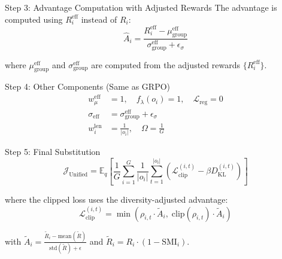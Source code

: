 \documentclass[11pt,a4paper]{article}
\begin{document}
\begin{proofbox}{Step 3: Advantage Computation with Adjusted Rewards}
The advantage is computed using $R_i^{\text{eff}}$ instead of $R_i$:
\begin{equation}
\hat{A}_i = \frac{R_i^{\text{eff}} - \mu_{\text{group}}^{\text{eff}}}{\sigma_{\text{group}}^{\text{eff}} + \epsilon_\sigma}
\end{equation}

where $\mu_{\text{group}}^{\text{eff}}$ and $\sigma_{\text{group}}^{\text{eff}}$ are computed from the adjusted rewards $\{R_i^{\text{eff}}\}$.
\end{proofbox}

\begin{proofbox}{Step 4: Other Components (Same as GRPO)}
\begin{align}
w_\mu^{\text{eff}} &= 1, \quad f_\lambda(o_i) = 1, \quad \mathcal{L}_{\text{reg}} = 0 \\
\sigma_{\text{eff}} &= \sigma_{\text{group}}^{\text{eff}} + \epsilon_\sigma \\
w_i^{\text{len}} &= \frac{1}{|o_i|}, \quad \Omega = \frac{1}{G}
\end{align}
\end{proofbox}

\begin{proofbox}{Step 5: Final Substitution}
\begin{equation}
\mathcal{J}_{\text{Unified}} = \mathbb{E}_{q} \left[ \frac{1}{G} \sum_{i=1}^{G} \frac{1}{|o_i|} \sum_{t=1}^{|o_i|} \left( \mathcal{L}_{\text{clip}}^{(i,t)} - \beta D_{\text{KL}}^{(i,t)} \right) \right]
\end{equation}

where the clipped loss uses the diversity-adjusted advantage:
\begin{equation}
\mathcal{L}_{\text{clip}}^{(i,t)} = \min\left( \rho_{i,t} \cdot \tilde{A}_i, \; \text{clip}(\rho_{i,t}) \cdot \tilde{A}_i \right)
\end{equation}

with $\tilde{A}_i = \frac{\tilde{R}_i - \text{mean}(\tilde{R})}{\text{std}(\tilde{R}) + \epsilon}$ and $\tilde{R}_i = R_i \cdot (1 - \text{SMI}_i)$.
\end{proofbox}
\end{document}
